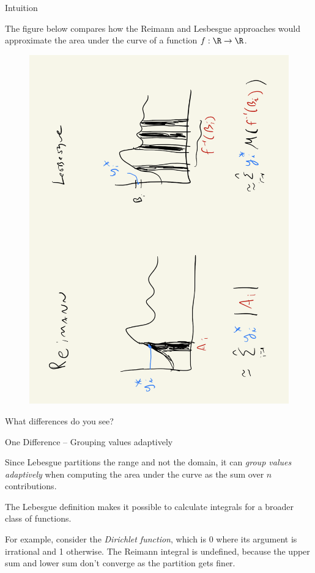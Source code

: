 \documentclass[10pt]{beamer}
\begin{document}
\begin{frame}{Intuition}

The figure below compares how the Reimann and Lesbesgue approaches would approximate the area under the curve of a function $f : \R \to \R$. 

\begin{figure}[H]
\centering 
\includegraphics[width=.6\textwidth, angle=270]{images/lesbesgue_vs_reimann}
\end{figure}
\end{frame}



\begin{frame}[standout]{}
What differences do you see?
\end{frame}

\begin{frame}{One Difference -- Grouping values adaptively}

Since Lebesgue partitions the range and not the domain, it can \textit{group values adaptively} when computing the area under the curve as the sum over $n$ contributions.  


The Lebesgue definition makes it possible to calculate integrals for a broader class of functions. 

For example, consider the \textit{Dirichlet function}, which is 0 where its argument is irrational and 1 otherwise.  The Reimann integral is undefined, because the upper sum and lower sum don't converge as the partition gets finer.

\end{frame}
\end{document}
